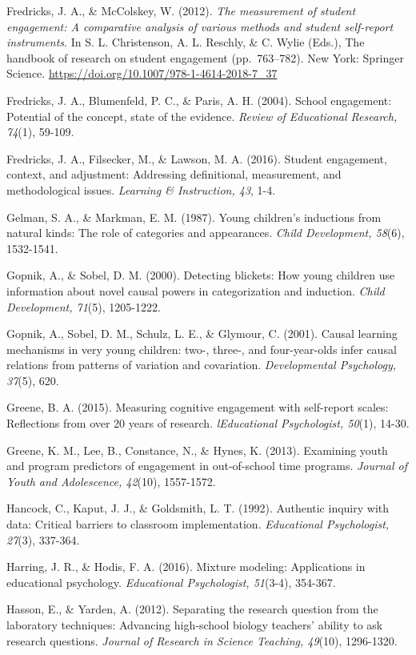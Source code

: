 \documentclass[]{msu-thesis}
\theoremstyle{definition}
\theoremstyle{definition}
\theoremstyle{definition}
\theoremstyle{remark}
\begin{document}
Fredricks, J. A., \& McColskey, W. (2012). \emph{The measurement of
student engagement: A comparative analysis of various methods and
student self-report instruments}. In S. L. Christenson, A. L. Reschly,
\& C. Wylie (Eds.), The handbook of research on student engagement
(pp.~763--782). New York: Springer Science.
\url{https://doi.org/10.1007/978-1-4614-2018-7_37}

Fredricks, J. A., Blumenfeld, P. C., \& Paris, A. H. (2004). School
engagement: Potential of the concept, state of the evidence.
\emph{Review of Educational Research, 74}(1), 59-109.

Fredricks, J. A., Filsecker, M., \& Lawson, M. A. (2016). Student
engagement, context, and adjustment: Addressing definitional,
measurement, and methodological issues. \emph{Learning \& Instruction,
43}, 1-4.

Gelman, S. A., \& Markman, E. M. (1987). Young children's inductions
from natural kinds: The role of categories and appearances. \emph{Child
Development, 58}(6), 1532-1541.

Gopnik, A., \& Sobel, D. M. (2000). Detecting blickets: How young
children use information about novel causal powers in categorization and
induction. \emph{Child Development, 71}(5), 1205-1222.

Gopnik, A., Sobel, D. M., Schulz, L. E., \& Glymour, C. (2001). Causal
learning mechanisms in very young children: two-, three-, and
four-year-olds infer causal relations from patterns of variation and
covariation. \emph{Developmental Psychology, 37}(5), 620.

Greene, B. A. (2015). Measuring cognitive engagement with self-report
scales: Reflections from over 20 years of research. \emph{lEducational
Psychologist, 50}(1), 14-30.

Greene, K. M., Lee, B., Constance, N., \& Hynes, K. (2013). Examining
youth and program predictors of engagement in out-of-school time
programs. \emph{Journal of Youth and Adolescence, 42}(10), 1557-1572.

Hancock, C., Kaput, J. J., \& Goldsmith, L. T. (1992). Authentic inquiry
with data: Critical barriers to classroom implementation.
\emph{Educational Psychologist, 27}(3), 337-364.

Harring, J. R., \& Hodis, F. A. (2016). Mixture modeling: Applications
in educational psychology. \emph{Educational Psychologist, 51}(3-4),
354-367.

Hasson, E., \& Yarden, A. (2012). Separating the research question from
the laboratory techniques: Advancing high‐school biology teachers'
ability to ask research questions. \emph{Journal of Research in Science
Teaching, 49}(10), 1296-1320.
\end{document}
